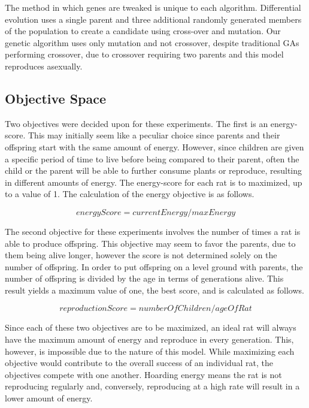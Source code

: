 \documentclass{sig-alternate}
\begin{document}
The method in which genes are tweaked is unique to each algorithm.  Differential evolution uses a single parent and three additional randomly generated members of the population to create a candidate using cross-over and mutation.  Our genetic algorithm uses only mutation and not crossover, despite traditional GAs performing crossover, due to crossover requiring two parents and this model reproduces asexually.

\subsection{Objective Space}
Two objectives were decided upon for these experiments.  The first is an energy-score.  This may initially seem like a peculiar choice since parents and their offspring start with the same amount of energy.  However, since children are given a specific period of time to live before being compared to their parent, often the child or the parent will be able to further consume plants or reproduce, resulting in different amounts of energy.  The energy-score for each rat is to maximized, up to a value of 1.  The calculation of the energy objective is as follows.

\begin{displaymath}
energyScore = currentEnergy / maxEnergy
\end{displaymath}

The second objective for these experiments involves the number of times a rat is able to produce offspring.  This objective may seem to favor the parents, due to them being alive longer, however the score is not determined solely on the number of offspring.  In order to put offspring on a level ground with parents, the number of offspring is divided by the age in terms of generations alive.  This result yields a maximum value of one, the best score, and is calculated as follows.

\begin{displaymath}
reproductionScore = numberOfChildren / ageOfRat
\end{displaymath}

Since each of these two objectives are to be maximized, an ideal rat will always have the maximum amount of energy and reproduce in every generation.  This, however, is impossible due to the nature of this model.  While maximizing each objective would contribute to the overall success of an individual rat, the objectives compete with one another.  Hoarding energy means the rat is not reproducing regularly and, conversely, reproducing at a high rate will result in a lower amount of energy.  
\end{document}
